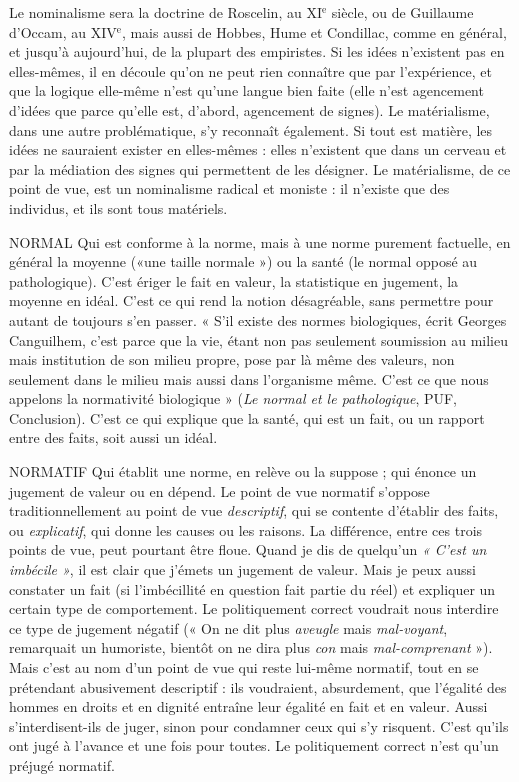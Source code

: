 Le nominalisme sera la doctrine de Roscelin, au {\footnotesize XI$^\text{e}$} siècle, ou de
Guillaume d’Occam, au {\footnotesize XIV$^\text{e}$}, mais aussi de Hobbes, Hume et Condillac,
comme en général, et jusqu’à aujourd’hui, de la plupart des empiristes. Si les
idées n'existent pas en elles-mêmes, il en découle qu'on ne peut rien
connaître que par l'expérience, et que la logique elle-même n’est qu’une
langue bien faite (elle n’est agencement d’idées que parce qu’elle est, d’abord,
agencement de signes). Le matérialisme, dans une autre problématique, s’y
reconnaît également. Si tout est matière, les idées ne sauraient exister en elles-mêmes :
elles n’existent que dans un cerveau et par la médiation des signes
qui permettent de les désigner. Le matérialisme, de ce point de vue, est un
nominalisme radical et moniste : il n’existe que des individus, et ils sont tous
matériels.

NORMAL Qui est conforme à la norme, mais à une norme purement factuelle,
en général la moyenne («une taille normale ») ou la
santé (le normal opposé au pathologique). C’est ériger le fait en valeur, la statistique
en jugement, la moyenne en idéal. C’est ce qui rend la notion désagréable,
sans permettre pour autant de toujours s’en passer. « S’il existe des
normes biologiques, écrit Georges Canguilhem, c’est parce que la vie, étant
non pas seulement soumission au milieu mais institution de son milieu
propre, pose par là même des valeurs, non seulement dans le milieu mais
aussi dans l'organisme même. C’est ce que nous appelons la normativité
biologique » ({\it Le normal et le pathologique}, PUF, Conclusion). C'est ce qui
explique que la santé, qui est un fait, ou un rapport entre des faits, soit aussi
un idéal.

NORMATIF Qui établit une norme, en relève ou la suppose ; qui énonce
un jugement de valeur ou en dépend. Le point de vue normatif
s'oppose traditionnellement au point de vue {\it descriptif}, qui se contente d'établir
des faits, ou {\it explicatif}, qui donne les causes ou les raisons. La différence, entre
ces trois points de vue, peut pourtant être floue. Quand je dis de quelqu'un
{\it « C'est un imbécile »}, il est clair que j’émets un jugement de valeur. Mais je peux
aussi constater un fait (si l’imbécillité en question fait partie du réel) et expliquer
un certain type de comportement. Le politiquement correct voudrait nous
interdire ce type de jugement négatif (« On ne dit plus {\it aveugle} mais {\it mal-voyant},
remarquait un humoriste, bientôt on ne dira plus {\it con} mais {\it mal-comprenant} »).
Mais c'est au nom d’un point de vue qui reste lui-même normatif, tout en se
prétendant abusivement descriptif : ils voudraient, absurdement, que l'égalité
des hommes en droits et en dignité entraîne leur égalité en fait et en valeur.
Aussi s’interdisent-ils de juger, sinon pour condamner ceux qui s’y risquent.
C’est qu'ils ont jugé à l’avance et une fois pour toutes. Le politiquement correct
n'est qu'un préjugé normatif.


